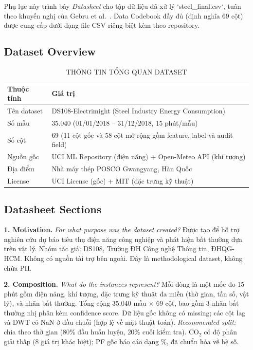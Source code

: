 \documentclass[conference]{IEEEtran}
\begin{document}
Phụ lục này trình bày \textit{Datasheet} cho tập dữ liệu đã xử lý `steel\_final.csv`, tuân theo khuyến nghị của Gebru et al.~\cite{gebru2021datasheets}.
Data Codebook đầy đủ (định nghĩa 69 cột) được cung cấp dưới dạng file CSV riêng biệt kèm theo repository.

\subsection{Dataset Overview}
\label{app:dataset-overview}

\begin{table}[htbp]
\caption{THÔNG TIN TỔNG QUAN DATASET}
\centering
\small
\begin{tabular}{@{}p{2.5cm}p{5.0cm}@{}}
\toprule
Thuộc tính & Giá trị \\
\midrule
Tên dataset & DS108-Electrimight (Steel Industry Energy Consumption) \\
Số mẫu & 35.040 (01/01/2018 -- 31/12/2018, 15 phút/mẫu) \\
Số cột & 69 (11 cột gốc và 58 cột mở rộng gồm feature, label và audit field) \\
Nguồn gốc & UCI ML Repository (điện năng) + Open-Meteo API (khí tượng) \\
Địa điểm & Nhà máy thép POSCO Gwangyang, Hàn Quốc \\
License & UCI License (gốc) + MIT (đặc trưng kỹ thuật) \\
\bottomrule
\end{tabular}
\end{table}

\subsection{Datasheet Sections}
\label{app:datasheet-gebru}

\noindent\textbf{1. Motivation.}
\textit{For what purpose was the dataset created?}
Được tạo để hỗ trợ nghiên cứu dự báo tiêu thụ điện năng công nghiệp và phát hiện bất thường dựa trên vật lý.
Nhóm tác giả: DS108, Trường ĐH Công nghệ Thông tin, ĐHQG-HCM.
Không có nguồn tài trợ bên ngoài.
Đây là methodological dataset, không chứa PII.

\noindent\textbf{2. Composition.}
\textit{What do the instances represent?}
Mỗi dòng là một mốc đo 15 phút gồm điện năng, khí tượng, đặc trưng kỹ thuật đa miền (thờ gian, tần số, vật lý), và nhãn bất thường.
Tổng cộng 35.040 mẫu × 69 cột, bao gồm 3 nhãn bất thường nhị phân kèm confidence score.
Dữ liệu gốc không có missing; các cột lag và DWT có NaN ở đầu chuỗi (hợp lệ về mặt thuật toán).
\textit{Recommended split:} chia theo thờ gian (80\% đầu huấn luyện, 20\% cuối kiểm tra).
CO$_2$ có độ phân giải thấp (8 giá trị khác biệt); PF gốc báo cáo dạng \%, đã chuẩn hóa về hệ số.
\end{document}
